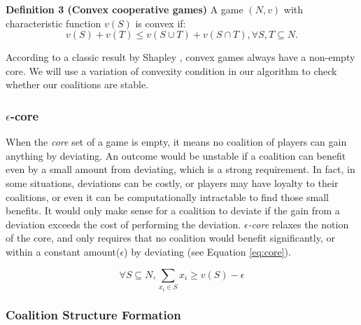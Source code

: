             {\bf Definition 3 (Convex cooperative games)} A game $(N,v)$ with
            characteristic function $v(S)$ is convex if:
            \begin{equation}\label{eq:convex}
            v(S) + v(T) \leq v(S \cup T) + v (S \cap T), \forall S,T \subseteq
            N.
            \end{equation}

            According to a classic result by Shapley \cite{S1971cores}, convex
            games always have a non-empty core. We will use a variation of
            convexity condition in our algorithm to check whether our
            coalitions are stable.

            \subsubsection*{$\epsilon$-core}\label{s:epsilon}
            When the \emph{core} set of a game is empty, it means no coalition
            of players can gain anything by deviating. An outcome would be
            unstable if a coalition can benefit even by a small amount from
            deviating, which is a strong requirement. In fact, in some
            situations, deviations can be costly, or players may have loyalty
            to their coalitions, or even it can be computationally intractable
            to find those small benefits. It would only make sense for a
            coalition to deviate if the gain from a deviation exceeds the cost
            of performing the deviation. \emph{$\epsilon$-core} relaxes the
            notion of the core, and only requires that no coalition would
            benefit significantly, or within a constant amount($\epsilon$) by
            deviating (see Equation \ref{eq:core}).

            \begin{equation}\label{eq:core2}
            \forall S \subseteq N, \sum_{x_i \in S} x_i \geq v(S) - \epsilon
            \end{equation}

            \subsubsection*{Coalition Structure Formation}\label{sec:coalition}


